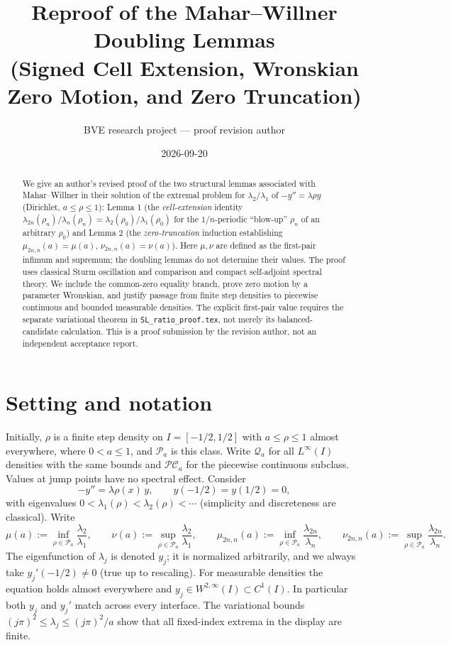 ﻿\documentclass[11pt]{article}
\title{Reproof of the Mahar--Willner Doubling Lemmas\\ \large (Signed Cell Extension, Wronskian Zero Motion, and Zero Truncation)}
\author{BVE research project --- proof revision author}
\date{2026-09-20}
\begin{document}
\maketitle

\begin{abstract}
We give an author's revised proof of the two structural lemmas associated with
Mahar--Willner \cite{mw} in their solution of the extremal problem for
$\lambda_2/\lambda_1$ of $-y''=\lambda\rho y$ (Dirichlet, $a\le\rho\le 1$):
Lemma 1 (the \emph{cell-extension} identity
$\lambda_{2n}(\rho_n)/\lambda_n(\rho_n)=\lambda_2(\rho_0)/\lambda_1(\rho_0)$
for the $1/n$-periodic ``blow-up'' $\rho_n$ of an arbitrary $\rho_0$) and
Lemma 2 (the \emph{zero-truncation} induction establishing
$\mu_{2n,n}(a)=\mu(a)$, $\nu_{2n,n}(a)=\nu(a)$).
Here $\mu,\nu$ are defined as the first-pair infimum and supremum; the
doubling lemmas do not determine their values. The proof uses classical
Sturm oscillation and comparison and compact self-adjoint spectral theory.
We include the common-zero equality branch, prove zero motion by a
parameter Wronskian, and justify passage from finite step densities to
piecewise continuous and bounded measurable densities. The explicit
first-pair value requires the separate variational theorem in
\texttt{SL\_ratio\_proof.tex}, not merely its balanced-candidate calculation.
This is a proof submission by the revision author, not an independent
acceptance report.
\end{abstract}

\section{Setting and notation}

Initially, $\rho$ is a finite step density on $I=[-1/2,1/2]$ with
$a\le\rho\le1$ almost everywhere, where $0<a\le1$, and $\mathcal P_a$
is this class. Write $\mathcal Q_a$ for all $L^\infty(I)$ densities with
the same bounds and $\mathcal{PC}_a$ for the piecewise continuous subclass.
Values at jump points have no spectral effect. Consider
\begin{equation}
	-y''=\lambda\rho(x)\,y,\qquad y(-1/2)=y(1/2)=0,
	\label{eq:main}
\end{equation}
with eigenvalues $0<\lambda_1(\rho)<\lambda_2(\rho)<\cdots$ (simplicity and
discreteness are classical).  Write
\[
	\mu(a):=\inf_{\rho\in\mathcal P_a}\frac{\lambda_2}{\lambda_1},\qquad
	\nu(a):=\sup_{\rho\in\mathcal P_a}\frac{\lambda_2}{\lambda_1},
	\qquad
	\mu_{2n,n}(a):=\inf_{\rho\in\mathcal P_a}\frac{\lambda_{2n}}{\lambda_n},
	\qquad
	\nu_{2n,n}(a):=\sup_{\rho\in\mathcal P_a}\frac{\lambda_{2n}}{\lambda_n}.
\]
The eigenfunction of $\lambda_j$ is denoted $y_j$; it is normalized
arbitrarily, and we always take $y_j'(-1/2)\neq 0$ (true up to rescaling).
For measurable densities the equation holds almost everywhere and
$y_j\in W^{2,\infty}(I)\subset C^1(I)$. In particular both $y_j$ and
$y_j'$ match across every interface. The variational bounds
$(j\pi)^2\le\lambda_j\le(j\pi)^2/a$ show that all fixed-index extrema
in the display are finite.
\end{document}
